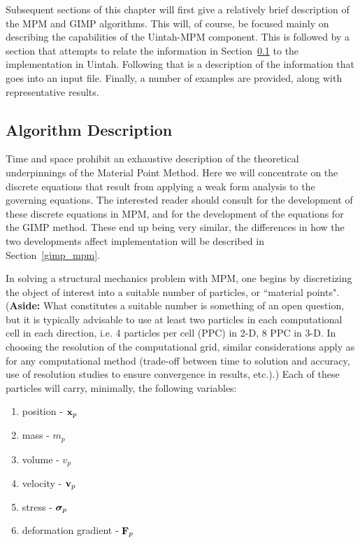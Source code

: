 Subsequent sections of this chapter will first give a relatively brief
description of the MPM and GIMP algorithms.  This will, of course, be
focused mainly on describing the capabilities of the Uintah-MPM component.
This is followed by a section that attempts to relate the information in
Section~\ref{Sec:AlgDesc} to the implementation in Uintah.
Following that is a description of the information that goes into an input
file.  Finally, a number of examples are provided, along with representative
results.

\subsection{Algorithm Description} \label{Sec:AlgDesc}

Time and space prohibit an exhaustive description of the theoretical
underpinnings of the Material Point Method.   Here we will concentrate
on the discrete equations that result from applying a weak form analysis
to the governing equations.  The interested reader should
consult \cite{sulskycmame,sulskycpc} for the development of these discrete
equations in MPM, and \cite{bardgimp} for the development of the equations
for the GIMP method.  These end up being very similar, the differences in
how the two developments affect implementation will be described in
Section~\ref{gimp_mpm}.

In solving a structural mechanics problem with MPM, one begins by discretizing
the object of interest into a suitable number of particles, or ``material
points".  ({\bf Aside:}  What constitutes a suitable number is something of an open
question, but it is typically advisable to use at least two particles in each
computational cell in each direction, i.e. 4 particles per cell (PPC) in 2-D,
8 PPC in 3-D. In choosing the resolution of the computational grid, similar
considerations apply as for any computational method (trade-off between
time to solution and accuracy, use of resolution studies to ensure convergence
in results, etc.).)  Each of these particles will carry, minimally, the
following variables:
\begin{enumerate}

\item position - $\bfx_p$
\item mass - $m_p$
\item volume - $v_p$
\item velocity - $\bfv_p$
\item stress - $\sig_p$ 
\item deformation gradient - $\bfF_p$

\end{enumerate}

